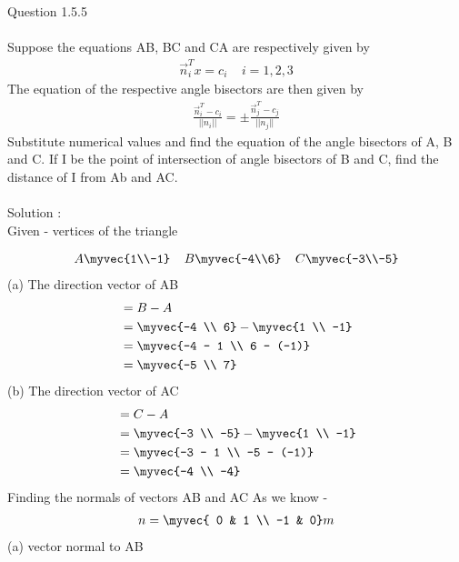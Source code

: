 \documentclass[journal,12pt,twocolumn]{IEEEtran}
\theoremstyle{remark}
\begin{document}
Question 1.5.5 \\ \\Suppose the equations AB, BC and CA are respectively given by
\begin{align}
\vec{n}_{i}^{T}x=c_{i} \;\; \; \; i=1 , 2 , 3
\end{align}
The equation of the respective angle bisectors are then given by
\begin{align}
\frac{\vec{n}_{i}^{T} - c_{i}}{||n_{i}||} = \pm \frac{\vec{n}_{j}^{T} - c_{j}}{||n_{j}||}
\end{align}
Substitute numerical values and find the equation of the angle bisectors of A, B and C. If I be the point of intersection of angle bisectors of B and C, find the distance of I from Ab and AC.\\ \\

Solution :\\

Given - vertices of the triangle

\begin{align}
A \myvec{1\\-1} \; \; \; \; B\myvec{-4\\6} \; \; \; \; C\myvec{-3\\-5}
\end{align}
(a) The direction vector of AB
\begin{align}
&= B - A \\
&= \myvec{-4 \\ 6} - \myvec{1 \\ -1}\\
&= \myvec{-4 - 1 \\ 6 - (-1)} \\
&= \myvec{-5 \\ 7}
\end{align}
(b) The direction vector of AC
\begin{align}
&= C - A \\
&= \myvec{-3 \\ -5} - \myvec{1 \\ -1}\\
&= \myvec{-3 - 1 \\ -5 - (-1)} \\
&= \myvec{-4 \\ -4}
\end{align}
Finding the normals of vectors AB and AC
As we know -
\begin{align}
n=\myvec{ 0 & 1 \\ -1 & 0} m
\end{align}
(a) vector normal to AB
\end{document}
